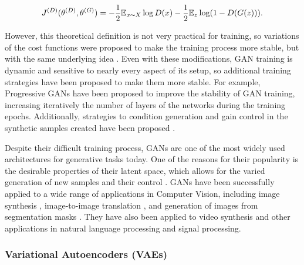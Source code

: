 \begin{equation}
J^{(D)}(\theta^{(D)}, \theta^{(G)}) = - \frac{1}{2} \mathbb{E}_{x \thicksim X } \log D(x) - \frac{1}{2} \mathbb{E}_{z} \log (1 - D(G(z))).
\end{equation}

However, this theoretical definition is not very practical for training, so variations of the cost functions were proposed to make the training process more stable, but with the same underlying idea \cite{journals/corr/abs-1711-10337}. Even with these modifications, GAN training is dynamic and sensitive to nearly every aspect of its setup, so additional training strategies have been proposed to make them more stable. For example, Progressive GANs \cite{karras2018progressive} have been proposed to improve the stability of GAN training, increasing iteratively the number of layers of the networks during the training epochs. Additionally, strategies to condition generation and gain control in the synthetic samples created have been proposed \cite{radford2015unsupervised, NIPS2016_8a3363ab, conf/nips/ChenCDHSSA16}.


Despite their difficult training process, GANs are one of the most widely used architectures for generative tasks today. One of the reasons for their popularity is the desirable properties of their latent space, which allows for the varied generation of new samples and their control \cite{shen2020interpreting, radford2015unsupervised}. GANs have been successfully applied to a wide range of applications in Computer Vision, including image synthesis \cite{NIPS2016_8a3363ab}, image-to-image translation \cite{Isola2017}, and generation of images from segmentation masks \cite{Wang2018, Park2019}. They have also been applied to video synthesis \cite{wang2018-video} and other applications in natural language processing and signal processing.


\subsubsection{Variational Autoencoders (VAEs)}



